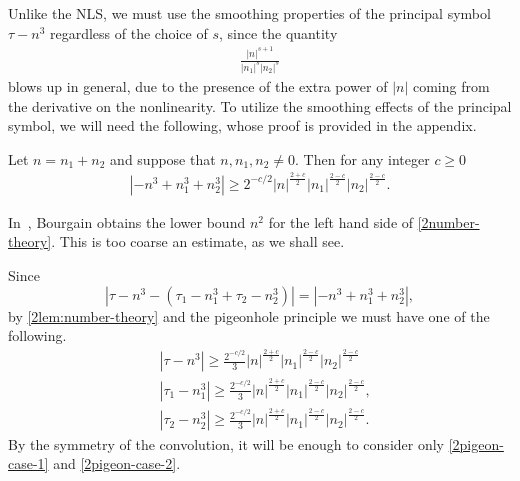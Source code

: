 %
%
Unlike the NLS, we must use the smoothing properties of the
principal symbol $\tau - n^3$ regardless of the choice of $s$, since the quantity
%
%
\begin{equation}
	\label{2convo-multiplier}
	\begin{split}
		\frac{|n|^{s+1}}{|n_1|^s |n_2|^s }
	\end{split}
\end{equation}
%
%
blows up in general, due to the presence of the extra power of $|n|$ coming from the derivative on
the nonlinearity. To utilize the smoothing effects of the principal symbol, we will need the following, whose
proof is provided in the appendix.
%
%
\begin{lemma}
	\label{2lem:number-theory}
	Let $n=n_1 + n_2$ and suppose that $n, n_1, n_2\neq
	0$. Then for any integer $c \ge 0$
%
%
\begin{equation}
	\begin{split}
		\label{2number-theory}
		| - n^{3} + n_1^3 + n_2^3| \ge 2^{-c/2} | n |^{\frac{2+c}{2}} | n_{1}
		|^{\frac{2-c}{2}}| n_2 |^{\frac{2-c}{2}}.
	\end{split}
\end{equation}
%
%
\end{lemma}
%
%
\begin{remark}
	In~\cite{Bourgain-Fourier-transfo}, Bourgain obtains the lower bound $n^2$ for
	the left hand side of \eqref{2number-theory}. This is too coarse an estimate,
	as we shall see.
\end{remark}
%
%
Since $$| \tau - n^{3} - \left( \tau_1 - n_1^3 
+ \tau_2 - n_2^3  \right ) | = | - n^{3} + n_1^3 +
n_2^3|,$$ by \cref{2lem:number-theory} and
the pigeonhole principle we must have one of the 
following.
%
%
\begin{align}
	\label{2pigeon-case-1}
	& |\tau - n^3| \ge \frac{2^{-c/2}}{3} | n |^{\frac{2+c}{2}} | n_{1}
		|^{\frac{2-c}{2}}| n_2 |^{\frac{2-c}{2}}		\\
		\label{2pigeon-case-2}
		& | \tau_1 - n_1^3 | \ge \frac{2^{-c/2}}{3} | n |^{\frac{2+c}{2}} | n_{1}
		|^{\frac{2-c}{2}}| n_2 |^{\frac{2-c}{2}},  
		\\
		\label{2pigeon-case-3}
		& | \tau_2 - n_2^3 | \ge
		\frac{2^{-c/2}}{3} | n |^{\frac{2+c}{2}} | n_{1}
		|^{\frac{2-c}{2}}| n_2 |^{\frac{2-c}{2}}.  
\end{align}
%
%
By the symmetry of the convolution, it will be enough to consider only
\eqref{2pigeon-case-1} and \eqref{2pigeon-case-2}.
%
%
%
